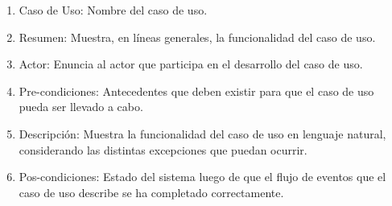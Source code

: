 \begin{enumerate}
\item Caso de Uso: Nombre del caso de uso.
\item Resumen: Muestra, en líneas generales, la funcionalidad del caso de uso.
\item Actor: Enuncia al actor que participa en el desarrollo del caso de uso.
\item Pre-condiciones: Antecedentes que deben existir para que el caso de uso pueda ser llevado a cabo.
\item Descripción: Muestra la funcionalidad del caso de uso en lenguaje natural, considerando las distintas excepciones que puedan ocurrir.
\item Pos-condiciones: Estado del sistema luego de que el flujo de eventos que el caso de uso describe se ha completado correctamente.
\end{enumerate}

